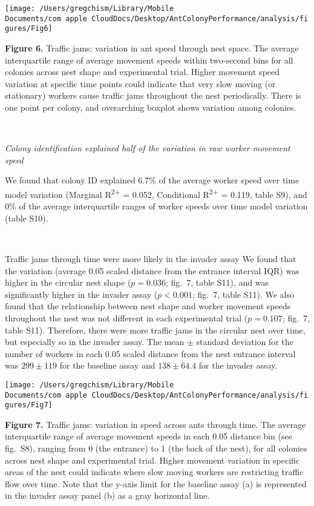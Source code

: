 \documentclass[3p]{elsarticle} %
\begin{document}
\begin{flushleft}\texttt{[image: /Users/gregchism/Library/Mobile Documents/com~apple~CloudDocs/Desktop/AntColonyPerformance/analysis/figures/Fig6]} \end{flushleft}

\textbf{Figure 6.} Traffic jams: variation in ant speed through nest
space. The average interquartile range of average movement speeds within
two-second bins for all colonies across nest shape and experimental
trial. Higher movement speed variation at specific time points could
indicate that very slow moving (or stationary) workers cause traffic
jams throughout the nest periodically. There is one point per colony,
and overarching boxplot shows variation among colonies.

~

\emph{Colony identification explained half of the variation in raw
worker movement speed}

We found that colony ID explained 6.7\% of the average worker speed over
time model variation (Marginal R\textsuperscript{2+} = 0.052,
Conditional R\textsuperscript{2+} = 0.119, table S9), and 0\% of the
average interquartile ranges of worker speeds over time model variation
(table S10).

~

Traffic jams through time were more likely in the invader assay We found
that the variation (average 0.05 scaled distance from the entrance
interval IQR) was higher in the circular nest shape (\(p = 0.036\);
fig.~7, table S11), and was significantly higher in the invader assay
(\(p < 0.001\); fig.~7, table S11). We also found that the relationship
between nest shape and worker movement speeds throughout the nest was
not different in each experimental trial (\(p = 0.107\); fig.~7, table
S11). Therefore, there were more traffic jams in the circular nest over
time, but especially so in the invader assay. The mean \(\pm\) standard
deviation for the number of workers in each 0.05 scaled distance from
the nest entrance interval was \(299\pm119\) for the baseline assay and
\(138\pm64.4\) for the invader assay.

\begin{flushleft}\texttt{[image: /Users/gregchism/Library/Mobile Documents/com~apple~CloudDocs/Desktop/AntColonyPerformance/analysis/figures/Fig7]} \end{flushleft}

\textbf{Figure 7.} Traffic jams: variation in speed across ants through
time. The average interquartile range of average movement speeds in each
0.05 distance bin (see fig.~S8), ranging from 0 (the entrance) to 1 (the
back of the nest), for all colonies across nest shape and experimental
trial. Higher movement variation in specific areas of the nest could
indicate where slow moving workers are restricting traffic flow over
time. Note that the y-axis limit for the baseline assay (a) is
represented in the invader assay panel (b) as a gray horizontal line.
\end{document}
